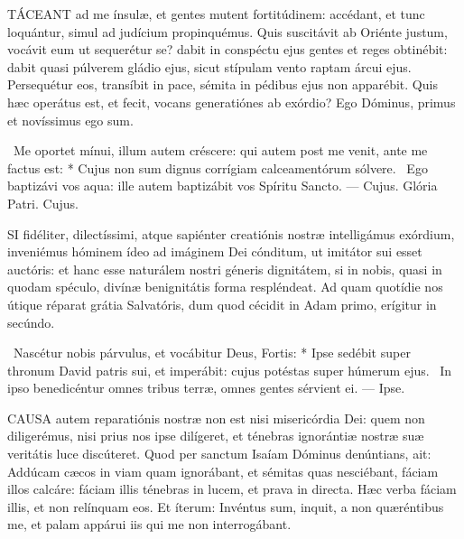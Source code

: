 
\lettrine[lines=2]{T}{ÁCEANT} ad me ínsulæ, et gentes mutent fortitúdinem: accédant, et tunc loquántur, simul ad judícium propinquémus. Quis suscitávit ab Oriénte justum, vocávit eum ut sequerétur se? dabit in conspéctu ejus gentes et reges obtinébit: dabit quasi púlverem gládio ejus, sicut stípulam vento raptam árcui ejus. Persequétur eos, transíbit in pace, sémita in pédibus ejus non apparébit. Quis hæc operátus est, et fecit, vocans generatiónes ab exórdio? Ego Dóminus, primus et novíssimus ego sum.

\R\ Me oportet mínui, illum autem créscere: qui autem post me venit, ante me factus est: * Cujus non sum dignus corrígiam calceamentórum sólvere. \V\ Ego baptizávi vos aqua: ille autem baptizábit vos Spíritu Sancto. --- Cujus. Glória Patri. Cujus.





\lettrine[lines=2]{S}{I} fidéliter, dilectíssimi, atque sapiénter creatiónis nostræ intelligámus exórdium, inveniémus hóminem ídeo ad imáginem Dei cónditum, ut imitátor sui esset auctóris: et hanc esse naturálem nostri géneris dignitátem, si in nobis, quasi in quodam spéculo, divínæ benignitátis forma respléndeat. Ad quam quotídie nos útique réparat grátia Salvatóris, dum quod cécidit in Adam primo, erígitur in secúndo.

\R\ Nascétur nobis párvulus, et vocábitur Deus, Fortis: * Ipse sedébit super thronum David patris sui, et imperábit: cujus potéstas super húmerum ejus. \V\ In ipso benedicéntur omnes tribus terræ, omnes gentes sérvient ei. --- Ipse.


\lettrine[lines=2]{C}{AUSA} autem reparatiónis nostræ non est nisi misericórdia Dei: quem non diligerémus, nisi prius nos ipse dilígeret, et ténebras ignorántiæ nostræ suæ veritátis luce discúteret. Quod per sanctum Isaíam Dóminus denúntians, ait: Addúcam cæcos in viam quam ignorábant, et sémitas quas nesciébant, fáciam illos calcáre: fáciam illis ténebras in lucem, et prava in directa. Hæc verba fáciam illis, et non relínquam eos. Et íterum: Invéntus sum, inquit, a non quæréntibus me, et palam appárui iis qui me non interrogábant.

